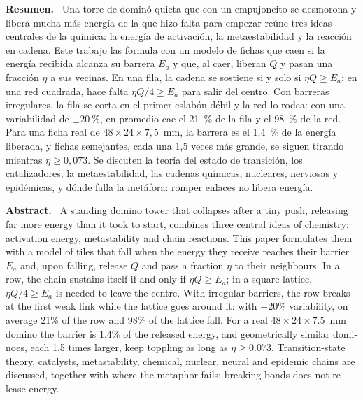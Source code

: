 \documentclass[11pt,a4paper]{article}
\title{\titulo}
\author{Bruno Loiacono\\[2pt]\small Estudiante de Física, Universidad de Buenos Aires}
\date{Noviembre de 2026\\[8pt]\fbox{\small Preprint, documento de trabajo sin revisión por pares}}
\newenvironment{resumen}{\par\noindent\small\textbf{Resumen.}\ }{\par\medskip}
\newenvironment{abstractEN}{\par\noindent\small\begin{otherlanguage}{english}\textbf{Abstract.}\ }{\end{otherlanguage}\par\medskip}
\begin{document}
\maketitle
\thispagestyle{fancy}

\begin{resumen}
Una torre de dominó quieta que con un empujoncito se desmorona y libera mucha más energía de la que hizo falta para empezar reúne tres ideas centrales de la química: la energía de activación, la metaestabilidad y la reacción en cadena. Este trabajo las formula con un modelo de fichas que caen si la energía recibida alcanza su barrera $E_a$ y que, al caer, liberan $Q$ y pasan una fracción $\eta$ a sus vecinas. En una fila, la cadena se sostiene si y solo si $\eta Q \ge E_a$; en una red cuadrada, hace falta $\eta Q/4 \ge E_a$ para salir del centro. Con barreras irregulares, la fila se corta en el primer eslabón débil y la red lo rodea: con una variabilidad de $\pm 20~\%$, en promedio cae el 21~\% de la fila y el 98~\% de la red. Para una ficha real de $48 \times 24 \times 7{,}5$~mm, la barrera es el 1,4~\% de la energía liberada, y fichas semejantes, cada una 1,5 veces más grande, se siguen tirando mientras $\eta \ge 0{,}073$. Se discuten la teoría del estado de transición, los catalizadores, la metaestabilidad, las cadenas químicas, nucleares, nerviosas y epidémicas, y dónde falla la metáfora: romper enlaces no libera energía.
\end{resumen}

\begin{abstractEN}
A standing domino tower that collapses after a tiny push, releasing far more energy than it took to start, combines three central ideas of chemistry: activation energy, metastability and chain reactions. This paper formulates them with a model of tiles that fall when the energy they receive reaches their barrier $E_a$ and, upon falling, release $Q$ and pass a fraction $\eta$ to their neighbours. In a row, the chain sustains itself if and only if $\eta Q \ge E_a$; in a square lattice, $\eta Q/4 \ge E_a$ is needed to leave the centre. With irregular barriers, the row breaks at the first weak link while the lattice goes around it: with $\pm 20\%$ variability, on average 21\% of the row and 98\% of the lattice fall. For a real $48 \times 24 \times 7.5$~mm domino the barrier is 1.4\% of the released energy, and geometrically similar dominoes, each 1.5 times larger, keep toppling as long as $\eta \ge 0.073$. Transition-state theory, catalysts, metastability, chemical, nuclear, neural and epidemic chains are discussed, together with where the metaphor fails: breaking bonds does not release energy.
\end{abstractEN}
\end{document}
